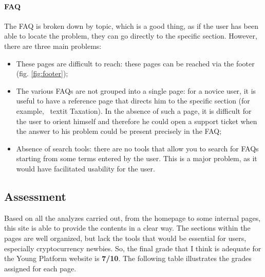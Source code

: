 \paragraph{FAQ}

The FAQ is broken down by topic, which is a good thing, as if the user has 
been able to locate the problem, they can go directly to the specific 
section. However, there are three main problems:
\begin{itemize}
  \item These pages are difficult to reach: these pages can be reached via 
  the footer (fig. \ref{fig:footer});
  
  \item The various FAQs are not grouped into a single page: for a novice 
  user, it is useful to have a reference page that directs him to the 
  specific section (for example, \ textit {Taxation}). In the absence of 
  such a page, it is difficult for the user to orient himself and 
  therefore he could open a support ticket when the answer to his problem 
  could be present precisely in the FAQ;

  \item Absence of search tools: there are no tools that allow you to 
  search for FAQs starting from some terms entered by the user. This is a 
  major problem, as it would have facilitated usability for the user.
\end{itemize}

\subsection{Assessment}

Based on all the analyzes carried out, from the homepage to some internal 
pages, this site is able to provide the contents in a clear way. The 
sections within the pages are well organized, but lack the tools that 
would be essential for users, especially cryptocurrency newbies. So, the 
final grade that I think is adequate for the Young Platform website is 
\textbf{7/10}. The following table illustrates the grades assigned for 
each page.

